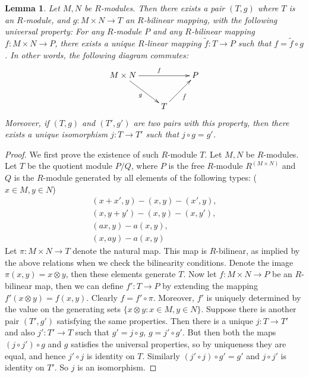 \documentclass[10pt,a4paper]{amsart}
\theoremstyle{plain}
\newtheorem{lemma}[subsection]{Lemma}
\theoremstyle{definition}
\theoremstyle{remark}
\numberwithin{equation}{subsection}
\begin{document}
\begin{lemma}
\label{lemma-tensor-product}
Let $M, N$ be $R$-modules. Then there exists a pair $(T, g)$
where $T$ is an $R$-module, and
$g : M \times N \to T$ an $R$-bilinear
mapping, with the following universal property:
For any $R$-module $P$ and any $R$-bilinear mapping
$f : M \times N \to P$, there
exists a unique $R$-linear
mapping $\tilde{f} : T \to P$ such that $f = \tilde{f} \circ g$.
In other words, the following diagram commutes:
$$
\xymatrix{
M \times N \ar[rr]^f \ar[dr]_g & & P\\
& T \ar[ur]_{\tilde f}
}
$$
Moreover, if $(T, g)$ and $(T', g')$
are two pairs with this property, then there
exists a unique isomorphism
$j : T \to T'$ such that $j\circ g = g'$.
\end{lemma}

\begin{proof}
We first prove the existence of such $R$-module $T$.
Let $M, N$ be $R$-modules.
Let $T$ be the quotient module
$P/Q$, where $P$ is the free $R$-module $R^{(M \times N)}$ and $Q$ is the
$R$-module generated by all elements of
the following types: ($x\in M, y\in N$)
\begin{align*}
(x + x', y) - (x, y) - (x', y), \\
(x, y + y') - (x, y) - (x, y'), \\
(ax, y) - a(x, y), \\
(x, ay) - a(x, y)
\end{align*}
Let $\pi : M \times N \to T$ denote the natural map.
This map is $R$-bilinear, as
implied by the above relations
when we check the bilinearity conditions. Denote the image
$\pi(x, y) = x \otimes
y$, then these elements generate
$T$. Now let $f : M \times N \to P$ be an $R$-bilinear map,
then we can define
$f' : T \to P$ by extending the mapping
$f'(x \otimes y) = f(x, y)$. Clearly $f = f'\circ \pi$. Moreover, $f'$ is
uniquely determined by the value on the
generating sets $\{x \otimes y : x\in M, y\in N\}$.
Suppose there is another pair $(T', g')$ satisfying the same properties.
Then there is a unique $j : T \to T'$ and
also $j' : T' \to T$ such that $g' = j\circ g$, $g = j'\circ g'$.
But then both the maps $(j\circ j') \circ g$ and $g$
satisfies the universal properties, so by uniqueness they are equal,
and hence $j'\circ j$ is identity on $T$.
Similarly $(j'\circ j) \circ g' = g'$ and $j\circ j'$ is identity on $T'$.
So $j$ is an isomorphism.
\end{proof}
\end{document}

